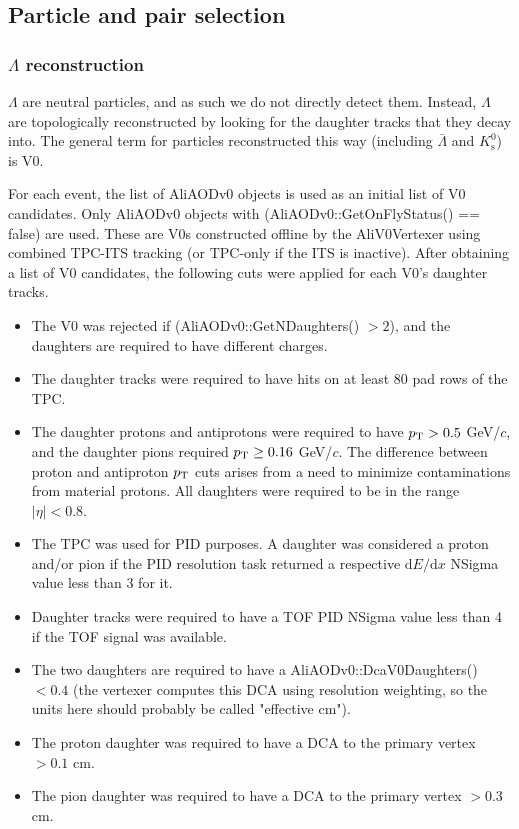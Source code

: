 \subsection{Particle and pair selection}
\label{sec:ParticlePairSelection}


\subsubsection{\texorpdfstring{$\Lambda$}{Lambda} reconstruction}
\label{sec:Recon}

$\Lambda$ are neutral particles, and as such we do not directly detect them.  
Instead, $\Lambda$ are topologically reconstructed by looking for the daughter tracks that they decay into.  
The general term for particles reconstructed this way (including $\bar{\Lambda}$ and $K^0_\mathrm{s}$) is V0.

For each event, the list of AliAODv0 objects is used as an initial list of V0 candidates.  
Only AliAODv0 objects with (AliAODv0::GetOnFlyStatus() == false) are used.  
These are V0s constructed offline by the AliV0Vertexer using combined TPC-ITS tracking (or TPC-only if the ITS is inactive).  
After obtaining a list of V0 candidates, the following cuts were applied for each V0's daughter tracks.

\begin{itemize}
\item The V0 was rejected if (AliAODv0::GetNDaughters() $> 2$), and the daughters are required to have different charges.
\item The daughter tracks were required to have hits on at least 80 pad rows of the TPC.
\item The daughter protons and antiprotons were required to have $p_{\rm T} > 0.5$ GeV/$c$, and the daughter pions required $p_{\rm T} \geq 0.16$ GeV/$c$. 
The difference between proton and antiproton $p_{\rm T}$ cuts arises from a need to minimize contaminations from material protons. 
All daughters were required to be in the range $|\eta| < 0.8$.
\item The TPC was used for PID purposes.  
A daughter was considered a proton and/or pion if the PID resolution task returned a respective $\mathrm{d}E/\mathrm{d}x$ NSigma value less than 3 for it.
\item Daughter tracks were required to have a TOF PID NSigma value less than 4 if the TOF signal was available.
\item The two daughters are required to have a AliAODv0::DcaV0Daughters() $< 0.4$ (the vertexer computes this DCA using resolution weighting, so the units here should probably be called "effective cm").
\item The proton daughter was required to have a DCA to the primary vertex $> 0.1$ cm.
\item The pion daughter was required to have a DCA to the primary vertex $> 0.3$ cm.
\end{itemize}

